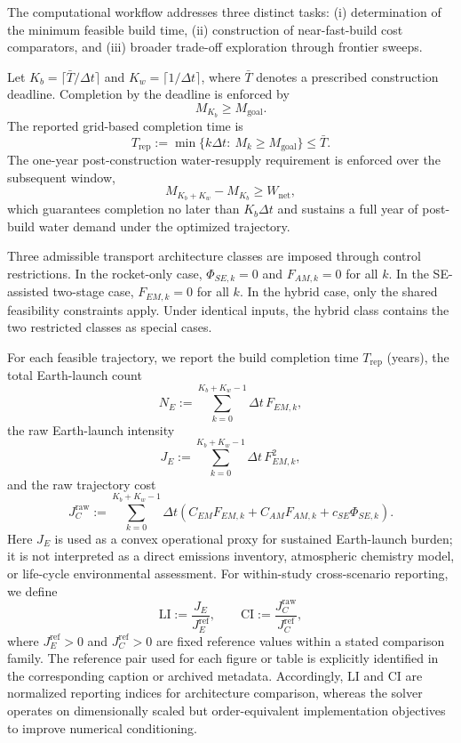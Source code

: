 \documentclass[12pt]{article}
\begin{document}
The computational workflow addresses three distinct tasks:
(i) determination of the minimum feasible build time,
(ii) construction of near-fast-build cost comparators, and
(iii) broader trade-off exploration through frontier sweeps.

Let $K_b=\lceil \bar{T}/\Delta t\rceil$ and $K_w=\lceil 1/\Delta t\rceil$, where $\bar{T}$ denotes a prescribed construction deadline. Completion by the deadline is enforced by
\begin{equation}
	M_{K_b}\ge M_{\mathrm{goal}}.
	\label{eq:completion_by_deadline_m3}
\end{equation}
The reported grid-based completion time is
\[
T_{\mathrm{rep}}:=\min\{k\Delta t:\ M_k\ge M_{\mathrm{goal}}\}\le \bar{T}.
\]
The one-year post-construction water-resupply requirement is enforced over the subsequent window,
\begin{equation}
	M_{K_b+K_w}-M_{K_b}\ge W_{\mathrm{net}},
	\label{eq:water_after_deadline_m3}
\end{equation}
which guarantees completion no later than $K_b\Delta t$ and sustains a full year of post-build water demand under the optimized trajectory.

Three admissible transport architecture classes are imposed through control restrictions. In the rocket-only case, $\Phi_{SE,k}=0$ and $F_{AM,k}=0$ for all $k$. In the SE-assisted two-stage case, $F_{EM,k}=0$ for all $k$. In the hybrid case, only the shared feasibility constraints apply. Under identical inputs, the hybrid class contains the two restricted classes as special cases.

For each feasible trajectory, we report the build completion time $T_{\mathrm{rep}}$ (years), the total Earth-launch count
\[
N_E:=\sum_{k=0}^{K_b+K_w-1}\Delta t\,F_{EM,k},
\]
the raw Earth-launch intensity
\[
J_E:=\sum_{k=0}^{K_b+K_w-1}\Delta t\,F_{EM,k}^2,
\]
and the raw trajectory cost
\[
J_C^{\mathrm{raw}}
:=\sum_{k=0}^{K_b+K_w-1}\Delta t\left(C_{EM}F_{EM,k}+C_{AM}F_{AM,k}+c_{SE}\Phi_{SE,k}\right).
\]
Here $J_E$ is used as a convex operational proxy for sustained Earth-launch burden; it is not interpreted as a direct emissions inventory, atmospheric chemistry model, or life-cycle environmental assessment. For within-study cross-scenario reporting, we define
\[
\mathrm{LI}:=\frac{J_E}{J_E^{\mathrm{ref}}},
\qquad
\mathrm{CI}:=\frac{J_C^{\mathrm{raw}}}{J_C^{\mathrm{ref}}},
\]
where $J_E^{\mathrm{ref}}>0$ and $J_C^{\mathrm{ref}}>0$ are fixed reference values within a stated comparison family. The reference pair used for each figure or table is explicitly identified in the corresponding caption or archived metadata. Accordingly, $\mathrm{LI}$ and $\mathrm{CI}$ are normalized reporting indices for architecture comparison, whereas the solver operates on dimensionally scaled but order-equivalent implementation objectives to improve numerical conditioning.
\end{document}
